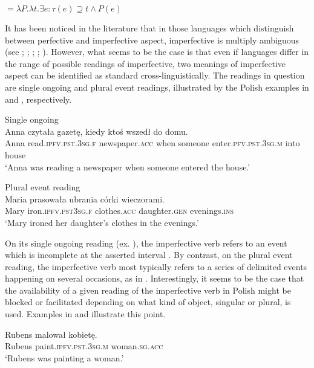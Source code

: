 \documentclass[output=paper]{langscibook}
\begin{document}
\ea {} $= \lambda P. \lambda t. \exists e : \tau(e) \supseteq t \wedge P(e)$\label{jan-bla:fansb:kb:ex1}
\z

\noindent It has been noticed in the literature that in those languages which distinguish between perfective and imperfective aspect, imperfective is multiply ambiguous (see \citealt {ArreguiRiveroandSalanova2014}; \citealt{CipriaandRoberts2000}; \citealt{Deo2009,Deo2015}; \citealt{Hacquard2006}; \citealt{deSwart1998}). However, what seems to be the case is that even if languages differ in the range of possible readings of imperfective, two meanings of imperfective aspect can be identified as standard cross-linguistically. The readings in question are single ongoing and plural event readings, illustrated by the Polish examples in  and , respectively.

\ea Single ongoing\label{jan-bla:fansb:kb:ex2}\\
\gll Anna czytała gazetę, kiedy ktoś wszedł do domu.\\  
     Anna read.\textsc{ipfv}.\textsc{pst}.\textsc{3sg}.\textsc{f} newspaper.\textsc{acc} when someone enter.\textsc{pfv}.\textsc{pst}.\textsc{3sg}.\textsc{m} into house\\
\glt ‘Anna was reading a newspaper when someone entered the house.’
\z

\ea Plural event reading\label{jan-bla:fansb:kb:ex3}\\
Maria prasowała ubrania córki wieczorami.\\  
Mary iron.\textsc{ipfv}.\textsc{pst}\textsc{3sg}.\textsc{f} clothes.\textsc{acc} daughter.\textsc{gen} evenings.\textsc{ins}\\
\glt ‘Mary ironed her daughter’s clothes in the evenings.’
\z

\noindent On its single ongoing reading (ex. ), the imperfective verb refers to an event which is incomplete at the asserted interval \citet[200--201]{Willim2006}. By contrast, on the plural event reading, the imperfective verb most typically refers to a series of delimited events happening on several occasions, as in . Interestingly, it seems to be the case that the availability of a given reading of the imperfective verb in Polish might be blocked or facilitated depending on what kind of object, singular or plural, is used. Examples in  and  illustrate this point.

\ea
\gll Rubens malował kobietę.\label{jan-bla:fansb:kb:ex4}\\  
     Rubens paint.\textsc{ipfv}.\textsc{pst}.\textsc{3sg}.\textsc{m} woman.\textsc{sg}.\textsc{acc}\\
\glt ‘Rubens was painting a woman.’
\z
\end{document}

